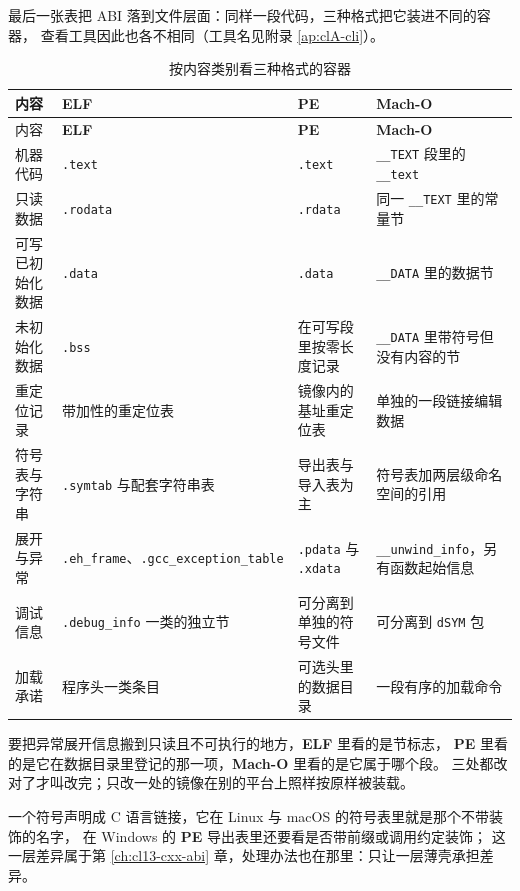 \documentclass[12pt,a4paper,fontset=fandol]{ctexbook}
\newcommand{\Tp}[1]{\texttt{#1}}
\newcommand{\Bk}{\discretionary{}{}{}}
\newcommand{\Lang}[1]{\textsf{#1}}
\newcommand{\CL}{\Lang{C}}
\newcommand{\Sect}[1]{\texttt{.#1}}
\newcommand{\Elf}{\textbf{\textsf{ELF}}}
\newcommand{\PeFmt}{\textbf{\textsf{PE}}}
\newcommand{\Macho}{\textbf{\textsf{Mach-O}}}
\newcommand{\Nix}{\textsf{Linux}}
\newcommand{\Win}{\textsf{Windows}}
\newcommand{\Mac}{\textsf{macOS}}
\begin{document}
最后一张表把 ABI 落到文件层面：同样一段代码，三种格式把它装进不同的容器，
查看工具因此也各不相同（工具名见附录 \ref{ap:clA-cli}）。

\begin{longtable}{@{}>{\raggedright\arraybackslash}p{} >{\raggedright\arraybackslash}p{} >{\raggedright\arraybackslash}p{} >{\raggedright\arraybackslash}p{}@{}}
\caption{按内容类别看三种格式的容器}\label{tab:apB-containers}\\
\toprule
内容 & \Elf & \PeFmt & \Macho \\
\midrule
\endfirsthead
\toprule
内容 & \Elf & \PeFmt & \Macho \\
\midrule
\endhead
\bottomrule
\endfoot
机器代码 & \Sect{text} & \Tp{.text} & \Tp{\_\_TEXT}{} 段里的 \Tp{\_\_text} \\
只读数据 & \Sect{rodata} & \Tp{.rdata} & 同一 \Tp{\_\_TEXT}{} 里的常量节 \\
可写已初始化数据 & \Sect{data} & \Tp{.data} & \Tp{\_\_DATA}{} 里的数据节 \\
未初始化数据 & \Sect{bss} & 在可写段里按零长度记录 & \Tp{\_\_DATA}{} 里带符号但没有内容的节 \\
重定位记录 & 带加性的重定位表 & 镜像内的基址重定位表 & 单独的一段链接编辑数据 \\
符号表与字符串 & \Sect{symtab}{} 与配套字符串表 & 导出表与导入表为主 & 符号表加两层级命名空间的引用 \\
展开与异常 & \Sect{eh\_frame}、\Sect{gcc\Bk\_exception\Bk\_table} & \Tp{.pdata}{} 与 \Tp{.xdata} & \Tp{\_\_unwind\_info}，另有函数起始信息 \\
调试信息 & \Sect{debug\_info}{} 一类的独立节 & 可分离到单独的符号文件 & 可分离到 \Tp{dSYM}{} 包 \\
加载承诺 & 程序头一类条目 & 可选头里的数据目录 & 一段有序的加载命令 \\
\end{longtable}

\begin{compare}[title=同一件事的三处位置]
要把异常展开信息搬到只读且不可执行的地方，\Elf{} 里看的是节标志，
\PeFmt{} 里看的是它在数据目录里登记的那一项，\Macho{} 里看的是它属于哪个段。
三处都改对了才叫改完；只改一处的镜像在别的平台上照样按原样被装载。
\end{compare}

\begin{abibox}[title=跨平台 ABI 检查的最小动作]
一个符号声明成 \CL{} 语言链接，它在 \Nix{} 与 \Mac{} 的符号表里就是那个不带装饰的名字，
在 \Win{} 的 \PeFmt{} 导出表里还要看是否带前缀或调用约定装饰；
这一层差异属于第 \ref{ch:cl13-cxx-abi} 章，处理办法也在那里：只让一层薄壳承担差异。
\end{abibox}
\end{document}
